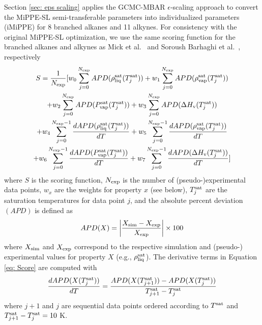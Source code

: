 \documentclass[journal=jced,manuscript=article]{achemso}
\begin{document}
Section \ref{sec: eps scaling} applies the GCMC-MBAR $\epsilon$-scaling approach to convert the MiPPE-SL semi-transferable parameters into individualized parameters (iMiPPE) for 8 branched alkanes and 11 alkynes. For consistency with the original MiPPE-SL optimization, we use the same scoring function for the branched alkanes and alkynes as Mick et al.~\cite{Potoff_branched} and Soroush Barhaghi et al.~\cite{Barhaghi2017}, respectively
\begin{multline} \label{eq: Score}
S= \frac{1}{N_{\rm exp}} [ w_0 \sum_{j=0}^{N_{\rm exp}} APD(\rho_{\rm liq}^{\rm sat}(T^{\rm sat}_j)) + w_1 \sum_{j=0}^{N_{\rm exp}} APD(\rho_{\rm vap}^{\rm sat}(T^{\rm sat}_j)) \\ + w_2 \sum_{j=0}^{N_{\rm exp}} APD(P_{\rm vap}^{\rm sat}(T^{\rm sat}_j)) + w_3 \sum_{j=0}^{N_{\rm exp}} APD(\Delta H_{\rm v} (T^{\rm sat}_j)) \\ + w_4 \sum_{j=0}^{N_{\rm exp}-1} \frac{d APD(\rho_{\rm liq}^{\rm sat}(T^{\rm sat}_j))}{dT} + w_5 \sum_{j=0}^{N_{\rm exp}-1} \frac{d APD(\rho_{\rm vap}^{\rm sat}(T^{\rm sat}_j))}{dT} \\ + w_6 \sum_{j=0}^{N_{\rm exp}-1} \frac{d APD(P_{\rm vap}^{\rm sat}(T^{\rm sat}_j))}{dT} + w_7 \sum_{j=0}^{N_{\rm exp}-1} \frac{d APD(\Delta H_{\rm v} (T^{\rm sat}_j))}{dT} ]
\end{multline}
where $S$ is the scoring function, $N_{\rm exp}$ is the number of (pseudo-)experimental data points, $w_{x}$ are the weights for property $x$ (see below), $T^{\rm sat}_j$ are the saturation temperatures for data point $j$, and the absolute percent deviation $(APD)$ is defined as
\begin{equation} \label{eq: APD}
APD(X) = \left| \frac{X_{\rm sim} - X_{\rm exp}}{X_{\rm exp}} \right| \times 100 
\end{equation}
where $X_{\rm sim}$ and $X_{\rm exp}$ correspond to the respective simulation and (pseudo-) experimental values for property $X$ (e.g., $\rho_{\rm liq}^{\rm sat}$). The derivative terms in Equation \ref{eq: Score} are computed with
\begin{equation}
\frac{d APD(X(T^{\rm sat}_{j}))}{dT} = \frac{APD(X(T^{\rm sat}_{j+1}))-APD(X(T^{\rm sat}_{j}))}{T^{\rm sat}_{j+1} - T^{\rm sat}_j}
\end{equation}
where $j+1$ and $j$ are sequential data points ordered according to $T^{\rm sat}$ and $T^{\rm sat}_{j+1} - T^{\rm sat}_j = 10$ K.
\end{document}
